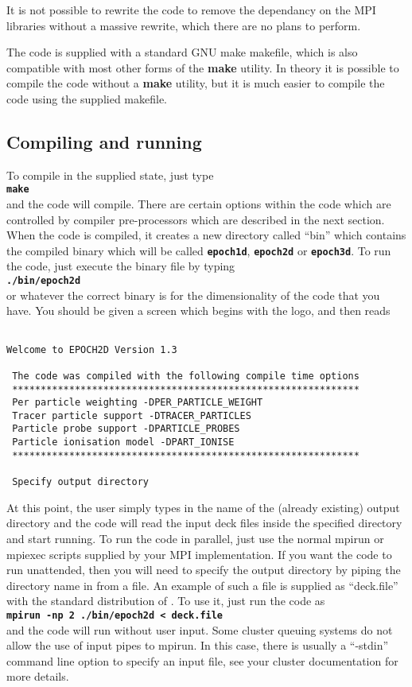 \documentclass[12pt,a4paper]{article}
\newcommand{\simpleboxverbatim}{\begin{Verbatim}[obeytabs=true,frame=single,
  framerule=0.5mm,rulecolor=\color{warwickmid},formatcom=\color{black}]}
\newcommand{\inlinecode}[1]{{\color{warwickred} \bf\texttt{#1}}}
\newcommand{\EPOCH}{{\color{warwickdark}\fontfamily{phv}\selectfont{EPOCH}}}
\begin{document}
It is not possible to rewrite the code to remove the dependancy on the MPI
libraries without a massive rewrite, which there are no plans to perform.

The code is supplied with a standard GNU make makefile, which is also
compatible with most other forms of the {\bf make} utility. In theory it is
possible to compile the code without a {\bf make} utility, but it is much
easier to compile the code using the supplied makefile.

\subsection{Compiling and running {\EPOCH}}

To compile {\EPOCH} in the supplied state, just type\\
\inlinecode{make}\\
and the code will compile. There are certain options within the code which are
controlled by compiler pre-processors which are described in the next
section. When the code is compiled, it creates a new directory called ``bin''
which contains the compiled binary which will be called \inlinecode{epoch1d},
\inlinecode{epoch2d} or \inlinecode{epoch3d}. To run the code, just execute the
binary file by typing\\
\inlinecode{./bin/epoch2d}\\
or whatever the correct binary is for the dimensionality of the code that you
have. You should be given a screen which begins with the {\EPOCH} logo, and then
reads\\

\simpleboxverbatim

Welcome to EPOCH2D Version 1.3

 The code was compiled with the following compile time options
 *************************************************************
 Per particle weighting -DPER_PARTICLE_WEIGHT
 Tracer particle support -DTRACER_PARTICLES
 Particle probe support -DPARTICLE_PROBES
 Particle ionisation model -DPART_IONISE
 *************************************************************

 Specify output directory

\end{Verbatim}

At this point, the user simply types in the name of the (already existing)
output directory and the code will read the input deck files inside the
specified directory and start running. To run the code in parallel, just use
the normal mpirun or mpiexec scripts supplied by your MPI implementation. If
you want the code to run unattended, then you will need to specify the output
directory by piping the directory name in from a file. An example of such a
file is supplied as ``deck.file'' with the standard distribution of \EPOCH. To
use it, just run the code as\\
\inlinecode{mpirun -np 2 ./bin/epoch2d < deck.file}\\
and the code will run without user input. Some cluster queuing systems do not
allow the use of input pipes to mpirun. In this case, there is usually a
``-stdin'' command line option to specify an input file, see your cluster
documentation for more details.
\end{document}
